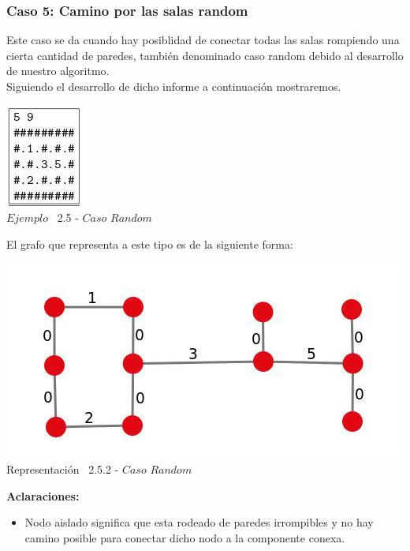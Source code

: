 \begin{center}
 \subsubsection*{Caso 5: Camino por las salas random}
\end{center}

Este caso se da cuando hay posiblidad de conectar todas las salas rompiendo una cierta cantidad de paredes, tambi\'en denominado caso random debido al desarrollo de nuestro algoritmo.\\

Siguiendo el desarrollo de dicho informe a continuaci\'on mostraremos.\\
 
\vspace*{0.3cm} \vspace*{0.3cm}
  \begin{center}
 \includegraphics[scale=1.6]{./EJ2/ej2random.jpeg}
\\ {$Ejemplo$ \ 2.5 - $Caso$ $Random$}
  \end{center}
  \vspace*{0.3cm}

El grafo que representa a este tipo es de la siguiente forma:\\

\vspace*{0.3cm} \vspace*{0.3cm}
  \begin{center}
 \includegraphics[scale=0.5]{./EJ2/ej2graforandom.jpeg}
 \\{Representación \ 2.5.2 - $Caso$ $Random$}
  \end{center}
  \vspace*{0.3cm}

\textbf{Aclaraciones:} 
\begin{itemize}
\item Nodo aislado significa que esta rodeado de paredes irrompibles y no hay camino posible para conectar dicho nodo a la componente conexa.
\end{itemize}
